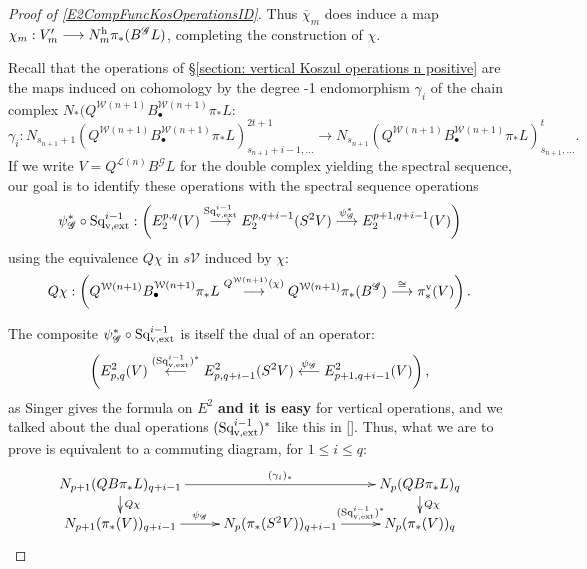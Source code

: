 \documentclass[11pt]{amsart}
\theoremstyle{plain}
\theoremstyle{definition}
\renewcommand{\to}{\longrightarrow}
\newcommand{\from}{\longleftarrow}
\newcommand{\scrG}{\mathscr{G}}
\newcommand{\calL}{\mathcal{L}}
\newcommand{\calV}{\mathcal{V}}
\newcommand{\calw}{\mathcal{W}}
\theoremstyle{plain}
\newcommand{\BSW}{{\scrG}}
\newcommand{\BSWres}{B^\BSW}%
\newcommand{\vExtCohOp}{\textup{Sq}_\textup{v,ext}}
\begin{document}
\begin{Operations in composite functor spectral sequences}
\begin{proof}[Proof of \ref{E2CompFuncKosOperationsID}]
Thus $\overline{\chi}_m$ does induce a map $\chi_m:V'_m\to N_m^\textup{h}\pi_*(\BSWres L)$, completing the construction of $\chi$.






Recall that the operations of \S\ref{section: vertical Koszul operations n positive} are the maps induced on cohomology by the degree -1 endomorphism $\gamma_i$ of the chain complex $N_*(Q^{\calw(n+1)} B^{\calw(n+1)}_{\bullet}\pi_*L$:
\[\gamma_i:N_{s_{n+1}+1}(Q^{\calw(n+1)} B^{\calw(n+1)}_{\bullet}\pi_*L)^{2t+1}_{s_{n+1}+i-1,\ldots}\to N_{s_{n+1}}(Q^{\calw(n+1)} B^{\calw(n+1)}_{\bullet}\pi_*L)^{t}_{s_{n+1},\ldots}.\]
If we write $V=Q^{\calL(n)}\BSWres L$ for the double complex yielding the spectral sequence, our goal is to identify these operations with the spectral sequence operations
\[\psi_{\BSW}^*\circ\vExtCohOp^{i-1}:\left(E^{p,q}_2(V)\overset{\vExtCohOp^{i-1}}{\to} E^{p,q+i-1}_2(S^2V)\overset{\psi_{\BSW}^*}{\to}E^{p+1,q+i-1}_2(V)\right)\]
using the equivalence $Q\chi$ in $s\calV$ induced by $\chi$:%
\[Q\chi:\left(Q^{\calw(n+1)}B^{\calw(n+1)}_{\bullet} \pi_*L\overset{Q^{\calw(n+1)}(\chi)}{\to} Q^{\calw(n+1)}\pi_*(\BSWres )\overset{\cong }{\to}\pi_*^\textup{v}(V)\right).\]

The composite $\psi_{\BSW}^*\circ\vExtCohOp^{i-1}$ is itself the dual of an operator:
\[\left(E_{p,q}^2(V)\overset{(\vExtCohOp^{i-1})^*}{\from} E_{p,q+i-1}^2(S^2V)\overset{\psi_{\BSW}}{\from}E_{p+1,q+i-1}^2(V)\right),\]
as Singer gives the formula on $E^2$ \textbf{and it is easy} for vertical operations, and we talked about the dual operations $(\vExtCohOp^{i-1})^*$ like this in []. Thus, what we are to prove is equivalent to a commuting diagram, for $1\leq i\leq q$:
\[\xymatrix@R=4mm{
N_{p+1}(QB\pi_*L)_{q+i-1}\ar[rr]^-{(\gamma_i)_*}
\ar[d]^-{Q\chi}
&%
&%
N_p(QB\pi_*L)_q\ar[d]^-{Q\chi}
\\%
N_{p+1}(\pi_*(V))_{q+i-1}\ar[r]^-{\psi_{\BSW}}
&%
N_{p}(\pi_*(S^2V))_{q+i-1}\ar[r]^-{(\vExtCohOp^{i-1})^*}
&%
N_p(\pi_*(V))_q%
}\]


\end{proof}
\end{Operations in composite functor spectral sequences}
\end{document}
